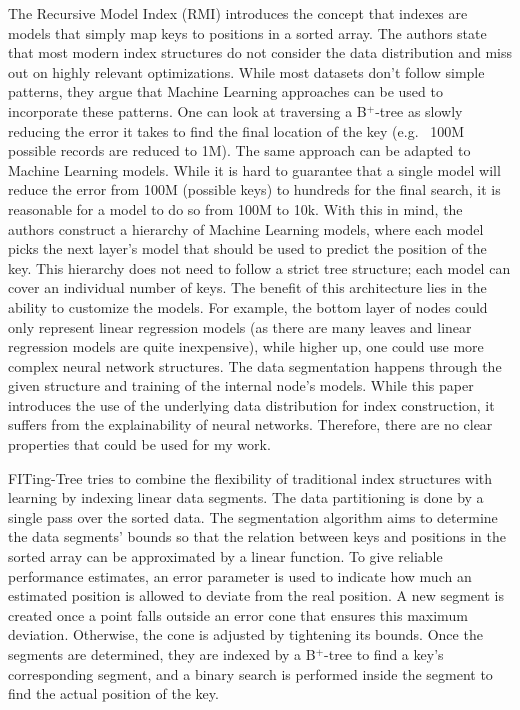 The Recursive Model Index (RMI) \cite{Kraska2018} introduces the concept that indexes are models that simply map keys to positions in a sorted array. The authors state that most modern index structures do not consider the data distribution and miss out on highly relevant optimizations. While most datasets don't follow simple patterns, they argue that Machine Learning approaches can be used to incorporate these patterns. One can look at traversing a B$^+$-tree as slowly reducing the error it takes to find the final location of the key (e.g.~ 100M possible records are reduced to 1M). The same approach can be adapted to Machine Learning models. While it is hard to guarantee that a single model will reduce the error from 100M (possible keys) to hundreds for the final search, it is reasonable for a model to do so from 100M to 10k. With this in mind, the authors construct a hierarchy of Machine Learning models, where each model picks the next layer's model that should be used to predict the position of the key. This hierarchy does not need to follow a strict tree structure; each model can cover an individual number of keys. The benefit of this architecture lies in the ability to customize the models. For example, the bottom layer of nodes could only represent linear regression models (as there are many leaves and linear regression models are quite inexpensive), while higher up, one could use more complex neural network structures. The data segmentation happens through the given structure and training of the internal node's models. While this paper introduces the use of the underlying data distribution for index construction, it suffers from the explainability of neural networks. Therefore, there are no clear properties that could be used for my work.

FITing-Tree \cite{Galakatos2019} tries to combine the ﬂexibility of traditional index structures with learning by indexing linear data segments. The data partitioning is done by a single pass over the sorted data. The segmentation algorithm aims to determine the data segments' bounds so that the relation between keys and positions in the sorted array can be approximated by a linear function. To give reliable performance estimates, an error parameter is used to indicate how much an estimated position is allowed to deviate from the real position. A new segment is created once a point falls outside an error cone that ensures this maximum deviation. Otherwise, the cone is adjusted by tightening its bounds. Once the segments are determined, they are indexed by a B$^+$-tree to find a key's corresponding segment, and a binary search is performed inside the segment to find the actual position of the key.


